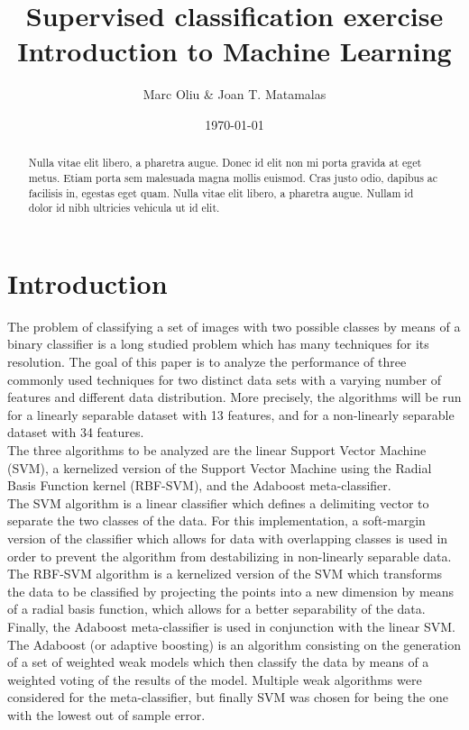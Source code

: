 \documentclass[10pt, journal]{IEEEtran}
\title{Supervised classification exercise\\Introduction to Machine Learning}
\author{Marc Oliu \& Joan T. Matamalas}
\date{\today}
\begin{document}
\ifpdf
{}
\else
{}
\fi

\maketitle

\begin{abstract}
Nulla vitae elit libero, a pharetra augue. Donec id elit non mi porta gravida at eget metus. Etiam porta sem malesuada magna mollis euismod. Cras justo odio, dapibus ac facilisis in, egestas eget quam. Nulla vitae elit libero, a pharetra augue. Nullam id dolor id nibh ultricies vehicula ut id elit.
\end{abstract}

\section{Introduction} %
\label{sec:introduction}
The problem of classifying a set of images with two possible classes by means of a binary classifier is a long studied problem which has many techniques for its resolution. The goal of this paper is to analyze the performance of three commonly used techniques for two distinct data sets with a varying number of features and different data distribution. More precisely, the algorithms will be run for a linearly separable dataset with 13 features, and for a non-linearly separable dataset with 34 features.\\

The three algorithms to be analyzed are the linear Support Vector Machine (SVM), a kernelized version of the Support Vector Machine using the Radial Basis Function kernel (RBF-SVM), and the Adaboost meta-classifier.\\

The SVM algorithm is a linear classifier which defines a delimiting vector to separate the two classes of the data. For this implementation, a soft-margin version of the classifier which allows for data with overlapping classes is used in order to prevent the algorithm from destabilizing in non-linearly separable data. The RBF-SVM algorithm is a kernelized version of the SVM which transforms the data to be classified by projecting the points into a new dimension by means of a radial basis function, which allows for a better separability of the data.\\

Finally, the Adaboost meta-classifier is used in conjunction with the linear SVM. The Adaboost (or adaptive boosting) is an algorithm consisting on the generation of a set of weighted weak models which then classify the data by means of a weighted voting of the results of the model. Multiple weak algorithms were considered for the meta-classifier, but finally SVM was chosen for being the one with the lowest out of sample error.
\end{document}
